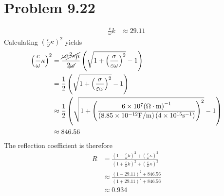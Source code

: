 \documentclass[12pt]{article}
\newcommand{\enterProblemHeader}[1]{
	\rhead{#1}
}
\newenvironment{homeworkProblem}[1]{
    \section{Problem #1}
    \enterProblemHeader{#1}
}{
	\pagebreak
}
\begin{document}
\begin{homeworkProblem}{9.22}
\begin{align*}
		\frac c \omega k &\approx 29.11
	\end{align*}
	Calculating $\left( \frac c \omega \kappa \right)^2$ yields
	\begin{align*}
		\left( \frac c \omega \kappa \right)^2 &= \frac {\cancel \omega \cancel
		{c^2 \varepsilon \mu}} {2 \cancel \omega} \left( \sqrt {1 + \left( \frac
		\sigma {\varepsilon \omega} \right)^2 } - 1 \right)\\
		&= \frac 12 \left( \sqrt{1 + \left( \frac \sigma { \varepsilon \omega }
		\right)^2 } - 1 \right)\\
		&\approx \frac 12 \left( \sqrt{1 + \left( \frac {6 \times 10^7
		\si{(\Omega \cdot m)}^{-1}} {\left(8.85 \times 10^{-12} \si{F/m} \right)
		\left(4 \times 10^{15} \si{s^{-1}}\right)} \right)^2 } - 1 \right)\\
		&\approx 846.56
	\end{align*}
	The reflection coefficient is therefore
	\begin{align*}
		R &= \frac { \left( 1 - \frac c \omega k \right)^2 + \left( \frac c \omega
		\kappa \right)^2 } { \left( 1 + \frac c \omega k \right)^2 + \left(
		\frac c \omega \kappa \right)^2 }\\
		&\approx \frac { (1 - 29.11)^2 + 846.56 } { (1 + 29.11)^2 + 846.56 }\\
		&\approx 0.934
	\end{align*}

\end{homeworkProblem}
\end{document}
